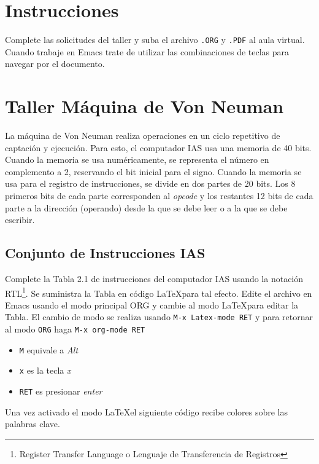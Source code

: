 \documentclass{article}
\begin{document}
\section{Instrucciones}
\label{sec:org7b9c085}
Complete las solicitudes del taller y suba el archivo \texttt{.ORG} y \texttt{.PDF}
al aula virtual. Cuando trabaje en Emacs trate de utilizar las
combinaciones de teclas para navegar por el documento.

\section{Taller Máquina de Von Neuman}
\label{sec:org87386bf}

La máquina de Von Neuman realiza operaciones en un ciclo repetitivo de
captación y ejecución. Para esto, el computador IAS usa una memoria de
40 bits. Cuando la memoria se usa numéricamente, se representa el
número en complemento a 2, reservando el bit inicial para el
signo. Cuando la memoria se usa para el registro de instrucciones, se
divide en dos partes de 20 bits. Los 8 primeros bits de cada parte
corresponden al \emph{opcode} y los restantes 12 bits de cada parte a la
dirección (operando) desde la que se debe leer o a la que se debe
escribir.

\subsection{Conjunto de Instrucciones IAS}
\label{sec:orgc555b26}
Complete la Tabla 2.1 de instrucciones del computador IAS
\autocite[p.47]{stallings2006} usando la notación RTL\footnote{Register Transfer Language o Lenguaje de Transferencia de Registros}. Se suministra
la Tabla en código \LaTeX para tal efecto. Edite el archivo en Emacs
usando el modo principal ORG y cambie al modo \LaTeX para editar la
Tabla. El cambio de modo se realiza usando \texttt{M-x Latex-mode RET} y para
retornar al modo \texttt{ORG} haga \texttt{M-x org-mode RET}

\begin{itemize}
\item \texttt{M} equivale a \emph{Alt}
\item \texttt{x} es la tecla \emph{x}
\item \texttt{RET} es presionar \emph{enter}
\end{itemize}

Una vez activado el modo \LaTeX el siguiente código recibe colores
sobre las palabras clave.
\end{document}
